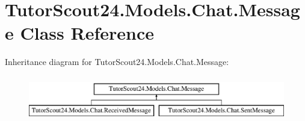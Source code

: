 \hypertarget{class_tutor_scout24_1_1_models_1_1_chat_1_1_message}{}\section{Tutor\+Scout24.\+Models.\+Chat.\+Message Class Reference}
\label{class_tutor_scout24_1_1_models_1_1_chat_1_1_message}
Inheritance diagram for Tutor\+Scout24.\+Models.\+Chat.\+Message\+:\begin{figure}[H]
\begin{center}
\leavevmode
\includegraphics[height=2.000000cm]{class_tutor_scout24_1_1_models_1_1_chat_1_1_message}
\end{center}
\end{figure}
